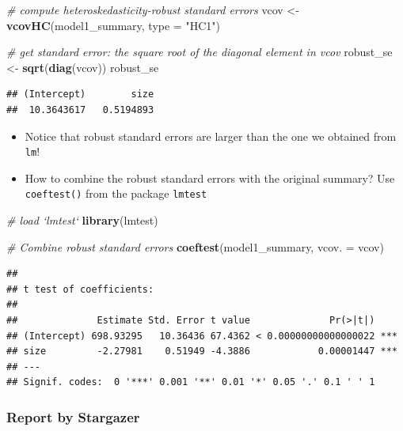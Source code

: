 \documentclass[]{book}
\newenvironment{Shaded}{\begin{snugshade}}{\end{snugshade}}
\newcommand{\KeywordTok}[1]{\textcolor[rgb]{0.13,0.29,0.53}{\textbf{#1}}}
\newcommand{\DataTypeTok}[1]{\textcolor[rgb]{0.13,0.29,0.53}{#1}}
\newcommand{\StringTok}[1]{\textcolor[rgb]{0.31,0.60,0.02}{#1}}
\newcommand{\CommentTok}[1]{\textcolor[rgb]{0.56,0.35,0.01}{\textit{#1}}}
\newcommand{\NormalTok}[1]{#1}
\providecommand{\tightlist}{%
  \setlength{\itemsep}{0pt}\setlength{\parskip}{0pt}}
\begin{document}
\begin{Shaded}
\begin{Highlighting}[]
\CommentTok{# compute heteroskedasticity-robust standard errors}
\NormalTok{vcov <-}\StringTok{ }\KeywordTok{vcovHC}\NormalTok{(model1_summary, }\DataTypeTok{type =} \StringTok{"HC1"}\NormalTok{)}

\CommentTok{# get standard error: the square root of the diagonal element in vcov}
\NormalTok{robust_se <-}\StringTok{ }\KeywordTok{sqrt}\NormalTok{(}\KeywordTok{diag}\NormalTok{(vcov))}
\NormalTok{robust_se}
\end{Highlighting}
\end{Shaded}

\begin{verbatim}
## (Intercept)        size 
##  10.3643617   0.5194893
\end{verbatim}

\begin{itemize}
\tightlist
\item
  Notice that robust standard errors are larger than the one we obtained
  from \texttt{lm}!
\item
  How to combine the robust standard errors with the original summary?
  Use \texttt{coeftest()} from the package \texttt{lmtest}
\end{itemize}

\begin{Shaded}
\begin{Highlighting}[]
\CommentTok{# load `lmtest`}
\KeywordTok{library}\NormalTok{(lmtest)}

\CommentTok{# Combine robust standard errors}
\KeywordTok{coeftest}\NormalTok{(model1_summary, }\DataTypeTok{vcov. =}\NormalTok{ vcov)}
\end{Highlighting}
\end{Shaded}

\begin{verbatim}
## 
## t test of coefficients:
## 
##              Estimate Std. Error t value              Pr(>|t|)    
## (Intercept) 698.93295   10.36436 67.4362 < 0.00000000000000022 ***
## size         -2.27981    0.51949 -4.3886            0.00001447 ***
## ---
## Signif. codes:  0 '***' 0.001 '**' 0.01 '*' 0.05 '.' 0.1 ' ' 1
\end{verbatim}

\subsubsection{Report by Stargazer}\label{report-by-stargazer}
\end{document}
